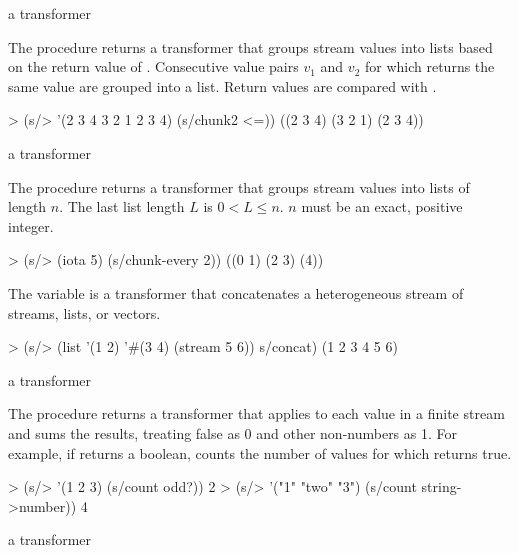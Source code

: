 \begin{procedure}
\end{procedure}
\returns{} a transformer

The  procedure returns a transformer that groups stream values into lists
based on the return value of . Consecutive value pairs $v_1$ and $v_2$ for
which  returns the same value are grouped into a
list. Return values are compared with .

\codebegin
> (s/> '(2 3 4 3 2 1 2 3 4) (s/chunk2 <=))
((2 3 4) (3 2 1) (2 3 4))
\codeend

\begin{procedure}
\end{procedure}
\returns{} a transformer

The  procedure returns a transformer that groups stream values into
lists of length $n$. The last list length $L$ is $0 < L \le n$. $n$ must be an exact,
positive integer.

\codebegin
> (s/> (iota 5) (s/chunk-every 2))
((0 1) (2 3) (4))
\codeend

\begin{variable}
\end{variable}
\antipar

The  variable is a transformer that concatenates a heterogeneous stream of
streams, lists, or vectors.

\codebegin
> (s/> (list '(1 2) '#(3 4) (stream 5 6)) s/concat)
(1 2 3 4 5 6)
\codeend

\begin{procedure}
\end{procedure}
\returns{} a transformer

The  procedure returns a transformer that applies  to each
value in a finite stream and sums the results, treating false as 0 and other non-numbers
as 1. For example, if  returns a boolean,  counts the number
of values for which  returns true.

\codebegin
> (s/> '(1 2 3) (s/count odd?))
2
> (s/> '("1" "two" "3") (s/count string->number))
4
\codeend

\begin{procedure}
\end{procedure}
\returns{} a transformer

